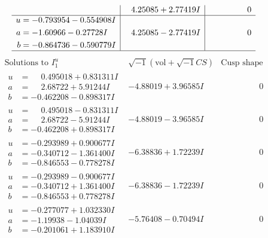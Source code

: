 \documentclass[1p]{elsarticle_modified}
\theoremstyle{definition}
\newcommand{\I}{\sqrt{-1}}
\begin{document}
$$\begin{array}{c|c|c}
 & \phantom{-}4.25085 + 2.77419 I & \phantom{-0.000000 } 0 \\ \hline\begin{aligned}
u &= -0.793954 - 0.554908 I \\
a &= -1.60966 - 0.27728 I \\
b &= -0.864736 - 0.590779 I\end{aligned}
 & \phantom{-}4.25085 - 2.77419 I & \phantom{-0.000000 } 0\\
 \hline 
 \end{array}$$\newpage$$\begin{array}{c|c|c}  
\text{Solutions to }I^u_{1}& \I (\text{vol} + \sqrt{-1}CS) & \text{Cusp shape}\\
 \hline 
\begin{aligned}
u &= \phantom{-}0.495018 + 0.831311 I \\
a &= \phantom{-}2.68722 + 5.91244 I \\
b &= -0.462208 - 0.898317 I\end{aligned}
 & -4.88019 + 3.96585 I & \phantom{-0.000000 } 0 \\ \hline\begin{aligned}
u &= \phantom{-}0.495018 - 0.831311 I \\
a &= \phantom{-}2.68722 - 5.91244 I \\
b &= -0.462208 + 0.898317 I\end{aligned}
 & -4.88019 - 3.96585 I & \phantom{-0.000000 } 0 \\ \hline\begin{aligned}
u &= -0.293989 + 0.900677 I \\
a &= -0.340712 - 1.361400 I \\
b &= -0.846553 - 0.778278 I\end{aligned}
 & -6.38836 + 1.72239 I & \phantom{-0.000000 } 0 \\ \hline\begin{aligned}
u &= -0.293989 - 0.900677 I \\
a &= -0.340712 + 1.361400 I \\
b &= -0.846553 + 0.778278 I\end{aligned}
 & -6.38836 - 1.72239 I & \phantom{-0.000000 } 0 \\ \hline\begin{aligned}
u &= -0.277077 + 1.032330 I \\
a &= -1.19938 - 1.04039 I \\
b &= -0.201061 + 1.183910 I\end{aligned}
 & -5.76408 - 0.70494 I & \phantom{-0.000000 } 0 \\ \hline\begin{aligned}

\end{aligned}
\end{array}$$
\end{document}
